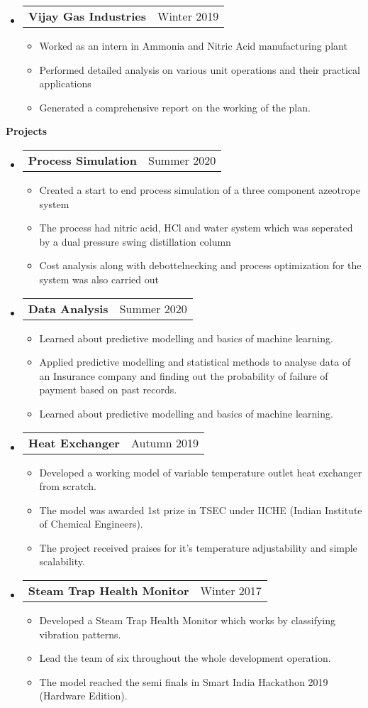 \documentclass[letterpaper,12pt]{article}[leftmargin=*]
\makeatletter
\def \entryspacing {-0pt}
\renewcommand{\section}[2]{\vspace{5pt}
  \colorbox{secondary}{\color{white}\raggedbottom\normalsize\textbf{{#1}{\hspace{7pt}#2}}}
}
\newcommand{\resumeEntryStart}{\begin{itemize}[leftmargin=2.5mm]}
\newcommand{\resumeEntryEnd}{\end{itemize}\vspace{\entryspacing}}
\newcommand{\resumeItemListStart}{\begin{itemize}[leftmargin=4.5mm]}
\newcommand{\resumeItemListEnd}{\end{itemize}}
\newcommand{\resumeItem}[1]{
  \item\small{
    {#1 \vspace{-2pt}}
  }
}
\newcommand{\resumeEntryTD}[2]{
  \vspace{-1pt}\item[]
    \begin{tabular*}{0.97\textwidth}{l@{\extracolsep{\fill}}r}
      \textbf{\color{primary}#1} & {\firabook\color{accent}\small#2} \\
    \end{tabular*}\vspace{-6pt}
}
\makeatother
\begin{document}
  \resumeEntryStart
      \resumeEntryTD
      {Vijay Gas Industries}{Winter 2019}
    \resumeItemListStart
      \resumeItem{Worked as an intern in Ammonia and Nitric Acid manufacturing plant}
      \resumeItem{Performed detailed analysis on various unit operations and their practical applications}
      \resumeItem{Generated a comprehensive report on the working of the plan.}
    \resumeItemListEnd
  \resumeEntryEnd
  

\section{\faTrophy}{Projects}

\resumeEntryStart
      \resumeEntryTD
      {Process Simulation}{Summer 2020}
    \resumeItemListStart
      \resumeItem {Created a start to end process simulation of a three component azeotrope system}
      \resumeItem {The process had nitric acid, HCl and water system which was seperated by a dual pressure swing distillation column}
      \resumeItem {Cost analysis along with debottelnecking and process optimization for the system was also carried out}
    \resumeItemListEnd
  \resumeEntryEnd


\resumeEntryStart
      \resumeEntryTD
      {Data Analysis}{Summer 2020}
    \resumeItemListStart
      \resumeItem {Learned about predictive modelling and basics of machine learning.}
      \resumeItem {Applied predictive modelling and statistical methods to analyse  data of an Insurance company and finding out the probability of failure of payment based on past records.}
      \resumeItem {Learned about predictive modelling and basics of machine learning.}
    \resumeItemListEnd
  \resumeEntryEnd


\resumeEntryStart
      \resumeEntryTD
      {Heat Exchanger}{Autumn 2019}
    \resumeItemListStart
      \resumeItem {Developed a working model of variable temperature outlet heat exchanger from scratch.}
      \resumeItem {The model was awarded 1st prize in TSEC under IICHE (Indian Institute of Chemical Engineers).}
      \resumeItem {The project received praises for it's temperature adjustability and simple scalability.}
    \resumeItemListEnd
  \resumeEntryEnd


\resumeEntryStart
      \resumeEntryTD
      {Steam Trap Health Monitor}{Winter 2017}
    \resumeItemListStart
      \resumeItem {Developed a Steam Trap Health Monitor which works by classifying vibration patterns.}
      \resumeItem {Lead the team of six throughout the whole development operation.}
      \resumeItem {The model reached the semi finals in Smart India Hackathon 2019 (Hardware Edition).}
    \resumeItemListEnd
  \resumeEntryEnd
\end{document}
